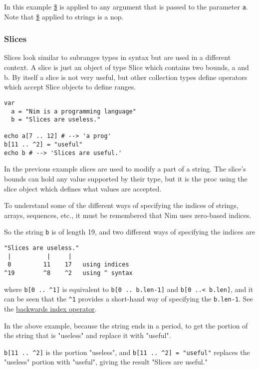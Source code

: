 In this example \href{dollars.html}{\$} is applied to any argument that
is passed to the parameter \texttt{a}. Note that \href{dollars.html}{\$}
applied to strings is a nop.

\hypertarget{slices}{%
\subsubsection{Slices}\label{slices}}

Slices look similar to subranges types in syntax but are used in a
different context. A slice is just an object of type Slice which
contains two bounds, {a} and {b}. By itself a slice is not very useful,
but other collection types define operators which accept Slice objects
to define ranges.

\begin{verbatim}
var
  a = "Nim is a programming language"
  b = "Slices are useless."

echo a[7 .. 12] # --> 'a prog'
b[11 .. ^2] = "useful"
echo b # --> 'Slices are useful.'
\end{verbatim}

In the previous example slices are used to modify a part of a string.
The slice's bounds can hold any value supported by their type, but it is
the proc using the slice object which defines what values are accepted.

To understand some of the different ways of specifying the indices of
strings, arrays, sequences, etc., it must be remembered that Nim uses
zero-based indices.

So the string \texttt{b} is of length 19, and two different ways of
specifying the indices are

\begin{verbatim}
"Slices are useless."
 |          |     |
 0         11    17   using indices
^19        ^8    ^2   using ^ syntax
\end{verbatim}

where \texttt{b{[}0\ ..\ \^{}1{]}} is equivalent to
\texttt{b{[}0\ ..\ b.len-1{]}} and
\texttt{b{[}0\ ..\textless{}\ b.len{]}}, and it can be seen that the
\texttt{\^{}1} provides a short-hand way of specifying the
\texttt{b.len-1}. See the \href{system.html\#\%5E.t\%2Cint}{backwards
index operator}.

In the above example, because the string ends in a period, to get the
portion of the string that is "useless" and replace it with "useful".

\texttt{b{[}11\ ..\ \^{}2{]}} is the portion "useless", and
\texttt{b{[}11\ ..\ \^{}2{]}\ =\ "useful"} replaces the "useless"
portion with "useful", giving the result "Slices are useful."

